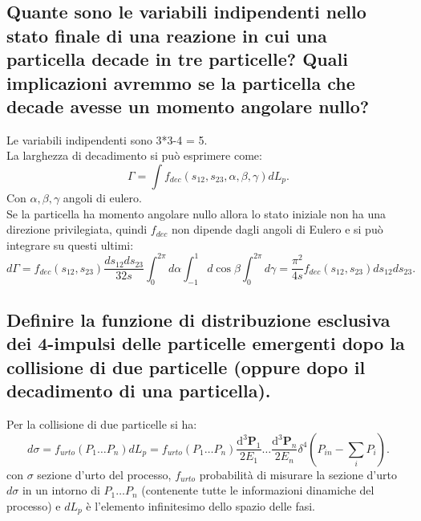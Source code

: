 \subsection[]{ Quante sono le variabili indipendenti nello stato finale di una reazione in cui una particella decade in tre particelle? Quali implicazioni avremmo se la particella che decade avesse un momento angolare nullo?}
Le variabili indipendenti sono 3*3-4 = 5.\\
La larghezza di decadimento si può esprimere come:
\[
	\Gamma = \int{f_{dec}\left( s_{12}, s_{23}, \alpha ,\beta,\gamma \right) dL_p}
.\] 
Con $\alpha, \beta,\gamma$ angoli di eulero.\\
Se la particella ha momento angolare nullo allora lo stato iniziale non ha una direzione privilegiata, quindi $f_{dec}$ non dipende dagli angoli di Eulero e si può integrare su questi ultimi:
\[
	d\Gamma = f_{dec}\left( s_{12}, s_{23} \right) \frac{ds_{12}ds_{23}}{32s} \int_0^{2 \pi}{d\alpha \int_{-1}^1{d\cos\beta \int_0^{2\pi}{ d\gamma }}} = \frac{\pi^2}{4s} f_{dec}\left( s_{12}, s_{23} \right) ds_{12}ds_{23}
.\]
\subsection[]{  Definire la funzione di distribuzione esclusiva dei 4-impulsi delle particelle emergenti dopo la collisione di due particelle (oppure dopo il decadimento di una particella).}
Per la collisione di due particelle si ha:
\[
	d\sigma = f_{urto}\left( P_1 \ldots P_n \right)dL_p = f_{urto}\left( P_1 \ldots P_n \right) \frac{\mbox{d}^3 \boldsymbol{P}_1}{2E_1}\ldots \frac{\mbox{d}^3 \boldsymbol{P}_n}{2E_n} \delta^4\left( P_{in}-\sum_{i}P_i \right) 
.\] 
con $\sigma$ sezione d'urto del processo, $f_{urto}$ probabilità di misurare la sezione d'urto $d\sigma$ in un intorno di $P_1 \ldots P_n$ (contenente tutte le informazioni dinamiche del processo) e $dL_p$ è l'elemento infinitesimo dello spazio delle fasi.

